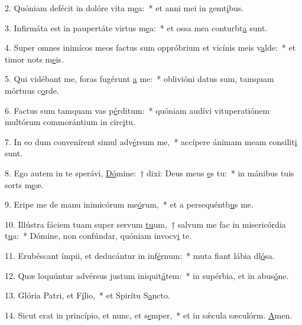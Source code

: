 2. Quóniam defécit in dolóre vita m\uline{e}a:~* et anni mei in gemt\uline{i}bus.\par 
3. Infirmáta est in paupertáte virtus m\uline{e}a:~* et ossa mea conturbt\uline{a} sunt.\par 
4. Super omnes inimícos meos factus sum oppróbrium et vicínis meis v\uline{a}lde:~* et timor nots m\uline{e}is.\par 
5. Qui vidébant me, foras fugérunt \uline{a} me:~* oblivióni datus sum, tamquam mórtuus  c\uline{o}rde.\par 
6. Factus sum tamquam vas p\uline{é}rditum:~* quóniam audívi vituperatiónem multórum commorántium in circ\uline{i}tu.\par 
7. In eo dum convenírent simul adv\uline{é}rsum me,~* accípere ánimam meam consilit\uline{i} sunt.\par 
8. Ego autem in te sperávi, \uline{Dó}mine:~† dixi: Deus meus \uline{e}s tu:~* in mánibus tuis sorts m\uline{e}æ.\par 
9. Eripe me de manu inimicórum me\uline{ó}rum,~* et a persequéntb\uline{u}s me.\par 
10. Illústra fáciem tuam super servum \uline{tu}um,~† salvum me fac in misericórdia t\uline{u}a:~* Dómine, non confúndar, quóniam invocv\uline{i} te.\par 
11. Erubéscant ímpii, et deducántur in inf\uline{é}rnum:~* muta fiant lábia dl\uline{ó}sa.\par 
12. Quæ loquúntur advérsus justum iniquit\uline{á}tem:~* in supérbia, et in abus\uline{ó}ne.\par 
13. Glória Patri, et F\uline{í}lio,~* et Spirítu S\uline{a}ncto.\par 
14. Sicut erat in princípio, et nunc, et s\uline{e}mper,~* et in sǽcula sæculórm. \uline{A}men.\par 

